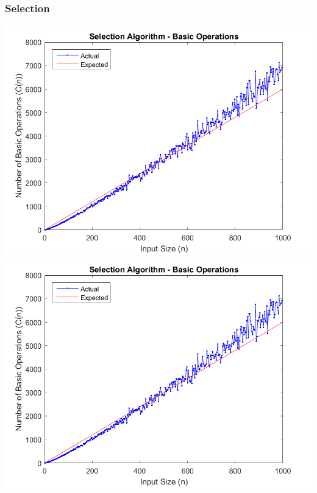 \documentclass{article}
\begin{document}
        \subsubsection{Selection}
            \includegraphics[scale=0.7]{Images/selection_algorithm_basic_operations.png}\\
            \includegraphics[scale=0.7]{Images/selection_algorithm_basic_operations.png}
\end{document}
